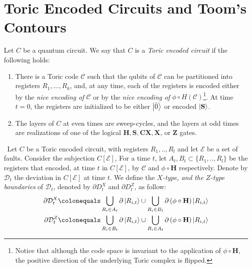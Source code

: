 



\section{Toric Encoded Circuits and Toom's Contours}

    \begin{definition}
      Let $C$ be a quantum circuit. We say that $C$ is a \textit{Toric encoded circuit} if the following holds:
      \begin{enumerate}
        \item There is a Toric code $\mathcal{C}$ such that the qubits of $\mathcal{C}$ can be partitioned into registers $R_{1}, \ldots, R_{k}$, and, at any time, each of the registers is encoded either by the \textit{nice encoding of} $\mathcal{C}$ or by the \textit{nice encoding of} $\phi \circ H (\mathcal{C})$\footnote{Notice that although the code space is invariant to the application of $\phi \circ \mathbf{H}$, the positive direction of the underlying Toric complex is flipped.}. At time $t=0$, the registers are initialized to be either $\ket{\bar{0}}$ or encoded $\ket{\mathbf{S}}$.
        \item The layers of $C$ at even times are sweep-cycles, and the layers at odd times are realizations of one of the logical $\mathbf{H}, \mathbf{S}, \mathbf{CX}, \mathbf{X}$, or $\mathbf{Z}$ gates.
        \end{enumerate} 
    \end{definition}

\begin{definition}  \ 
  Let $C$ be a Toric encoded circuit, with registers $R_{1},..,R_{l}$ and let $\mathcal{E}$ be a set of faults. Consider the subjection $C[\mathcal{E}]$, For a time $t$, let $A_{t},B_{t} \subset \{R_{1},..,R_{l}\}$ be the registers that encoded, at time $t$ in $C[\mathcal{E}]$, by $\mathcal{C}$ and $\phi \circ \mathbf{H}$ respectively. Denote by $\mathcal{D}_{t}$ the deviation in $C[\mathcal{E}]$ at time $t$. We define the \textit{$X$-type, and the $Z$-type boundaries} of $\mathcal{D}_{t}$, denoted by $\partial{D}^{X}_{t}$ and $\partial{D}^{Z}_{t}$, as follow:   
  \begin{equation*}
    \begin{split}
      \partial \mathcal{D}^{X}_{t}  & \colonequals \bigcup_{R_{i} \in A_{t}} \partial \ket{R_{i,t}} \cup\bigcup_{R_{i} \in B_{t}} \partial \left(\phi \circ \mathbf{H}\right) \ket{R_{i,t}} \\
    \partial \mathcal{D}^{Z}_{t}  & \colonequals \bigcup_{R_{i} \in B_{t}} \partial \ket{R_{i,t}} \cup\bigcup_{R_{i} \in A_{t}} \partial \left( \phi \circ \mathbf{H}\right) \ket{R_{i,t}} 
    \end{split}
  \end{equation*}
\end{definition}


